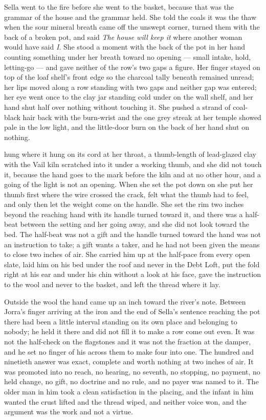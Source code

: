 Sella went to the fire before she went to the basket, because that was the grammar of the house and the grammar held. She told the coals it was the thaw when the sour mineral breath came off the unswept corner, turned them with the back of a broken pot, and said \emph{The house will keep it} where another woman would have said \emph{I}. She stood a moment with the back of the pot in her hand counting something under her breath toward no opening --- small intake, hold, letting-go --- and gave neither of the row's two gaps a figure. Her finger stayed on top of the loaf shelf's front edge so the charcoal tally beneath remained unread; her lips moved along a row standing with two gaps and neither gap was entered; her eye went once to the clay jar standing cold under  on the wall shelf, and her hand shut half over nothing without touching it. She pushed a strand of coal-black hair back with the burn-wrist and the one grey streak at her temple showed pale in the low light, and the little-door burn on the back of her hand shut on nothing.

 hung where it hung on its cord at her throat, a thumb-length of lead-glazed clay with the Vail kiln scratched into it under a working thumb, and she did not touch it, because the hand goes to the mark before the kiln and at no other hour, and a going of the light is not an opening. When she set the pot down on  she put her thumb first where the wire crossed the crack, felt what the thumb had to feel, and only then let the weight come on the handle. She set the rim two inches beyond the reaching hand with its handle turned toward it, and there was a half-beat between the setting and her going away, and she did not look toward the bed. The half-beat was not a gift and the handle turned toward the hand was not an instruction to take; a gift wants a taker, and he had not been given the means to close two inches of air. She carried him up at the half-pace from every open slate, laid him on his bed under the roof and never in the Debt Loft, put the fold right at his ear and under his chin without a look at his face, gave the instruction to the wool and never to the basket, and left the thread where it lay.

Outside the wool the hand came up an inch toward the river's note. Between Jorra's finger arriving at the iron and the end of Sella's sentence reaching the pot there had been a little interval standing on its own place and belonging to nobody; he held it there and did not fill it to make a row come out even. It was not the half-check on the flagstones and it was not the fraction at the damper, and he set no finger of his across them to make four into one. The hundred and ninetieth answer was exact, complete and worth nothing at two inches of air. It was promoted into no reach, no hearing, no seventh, no stopping, no payment, no held change, no gift, no doctrine and no rule, and no payer was named to it. The older man in him took a clean satisfaction in the placing, and the infant in him wanted the crust lifted and the thread wiped, and neither voice won, and the argument was the work and not a virtue.


